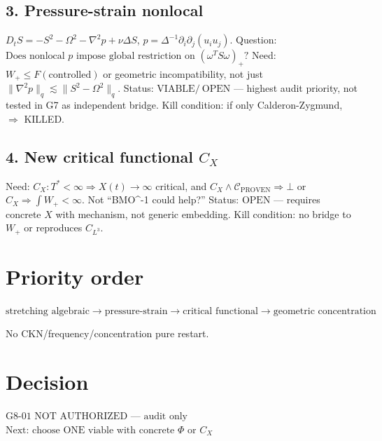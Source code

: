 \documentclass[11pt]{article}
\begin{document}
\subsection{3. Pressure-strain nonlocal}
$D_tS=-S^2-\Omega^2-\nabla^2p+\nu\Delta S$, $p=\Delta^{-1}\partial_i\partial_j(u_iu_j)$.
Question: $\boxed{\text{Does nonlocal }p\text{ impose global restriction on }(\omega^TS\omega)_+?}$
Need: $W_+\le F(\text{controlled})$ or geometric incompatibility, not just $\|\nabla^2p\|_q\lesssim\|S^2-\Omega^2\|_q$.
Status: $\boxed{\mathrm{VIABLE/\ OPEN}}$ — highest audit priority, not tested in G7 as independent bridge.
Kill condition: if only Calderon-Zygmund, $\Rightarrow$ KILLED.

\subsection{4. New critical functional $C_X$}
Need: $\boxed{C_X: T^*<\infty\Rightarrow X(t)\to\infty}$ critical, and $\boxed{C_X\land\mathcal C_{\mathrm{PROVEN}}\Rightarrow\bot}$ or $\boxed{C_X\Rightarrow\int W_+<\infty}$.
Not ``BMO^{-1} could help?''
Status: $\boxed{\mathrm{OPEN}}$ — requires concrete $X$ with mechanism, not generic embedding.
Kill condition: no bridge to $W_+$ or reproduces $C_{L^3}$.

\section{Priority order}
\begin{center}
$\boxed{\text{stretching algebraic}\to\text{pressure-strain}\to\text{critical functional}\to\text{geometric concentration}}$
\end{center}
No CKN/frequency/concentration pure restart.

\section{Decision}
\begin{center}
$\boxed{\text{G8-01 NOT AUTHORIZED — audit only}}$\\
$\boxed{\text{Next: choose ONE viable with concrete }\Phi\text{ or }C_X}$
\end{center}
\end{document}
